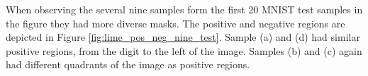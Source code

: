 




When observing the several nine samples form the first 20 MNIST test samples in
the figure they had more diverse masks. The positive and negative regions are
depicted in Figure \ref{fig:lime_pos_neg_nine_test}. Sample (a) and (d) had
similar positive regions, from the digit to the left of the image. Samples (b)
and (c) again had different quadrants of the image as positive regions. 

